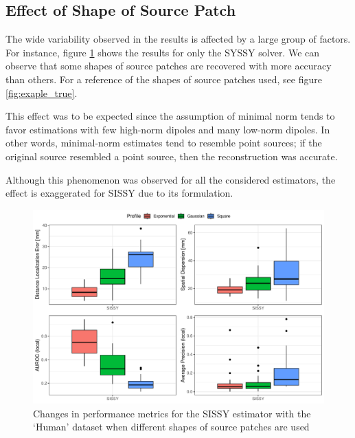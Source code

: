 \subsection{Effect of Shape of Source Patch}

The wide variability observed in the results is affected by a large group of factors.
%
For instance, figure \ref{fig:deets_SISSY} shows the results for only the SYSSY solver.
%
We can observe that some shapes of source patches are recovered with more accuracy than others.
%
For a reference of the shapes of source patches used, see figure \ref{fig:exaple_true}.
%

This effect was to be expected since the assumption of minimal norm tends to favor estimations with few high-norm dipoles and many low-norm dipoles.
%
In other words, minimal-norm estimates tend to resemble point sources; if the original source resembled a point source, then the reconstruction was accurate.


Although this phenomenon was observed for all the considered estimators, the effect is exaggerated for SISSY due to its formulation.


\begin{figure}
    \centering
    \includegraphics[width=0.9\linewidth]{img_stats/shape_EvalMetrics_Protocol04_30ALL.pdf}
    \caption{Changes in performance metrics for the SISSY estimator with the `Human' dataset when different shapes of source patches are used}
    \label{fig:deets_SISSY}
\end{figure}


